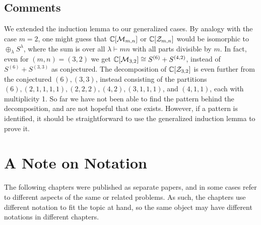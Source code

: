 \subsection{Comments}
We extended the induction lemma to our generalized cases.
By analogy with the case $m=2$, one might guess that $\mathbb{C}[\mathcal{M}_{m,n}]$ or $\mathbb{C}[\mathcal{Z}_{m,n}]$ would be isomorphic to $\oplus_\lambda S^\lambda$, where the sum is over all $\lambda \vdash mn$ with all parts divisible by $m$.
In fact, even for $(m,n)=(3,2)$ we get $\mathbb{C}[\mathcal{M}_{3,2}] \cong S^{(6)} + S^{(4,2)}$, instead of $S^{(6)} + S^{(3,3)}$ as conjectured.
The decomposition of $\mathbb{C}[\mathcal{Z}_{3,2}]$ is even further from the conjectured $(6),(3,3)$, instead consisting of the partitions $(6), (2, 1, 1, 1, 1), (2, 2, 2), (4, 2), (3, 1, 1, 1)$, and $(4, 1, 1)$, each with multiplicity 1.
So far we have not been able to find the pattern behind the decomposition, and are not hopeful that one exists.
However, if a pattern is identified, it should be straightforward to use the generalized induction lemma to prove it.


\section{A Note on Notation}
The following chapters were published as separate papers, and in some cases refer to different aspects of the same or related problems. 
As such, the chapters use different notation to fit the topic at hand, so the same object may have different notations in different chapters.

